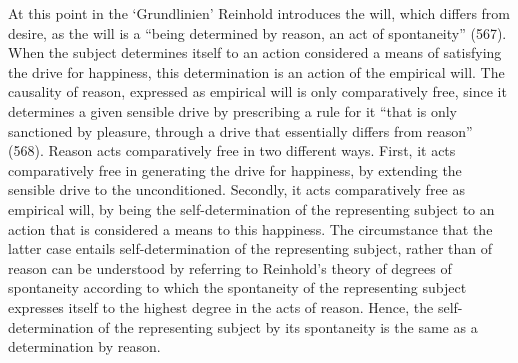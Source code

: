  At this point in the `Grundlinien' Reinhold introduces the will, which differs from desire, as the will is a ``being determined by reason, an act of spontaneity'' (567). When the subject determines itself to an action considered a means of satisfying the drive for happiness, this determination is an action of the empirical will. The causality of reason, expressed as empirical will is only comparatively free, since it determines a given sensible drive by prescribing a rule for it ``that is only sanctioned by pleasure, through a drive that essentially differs from reason'' (568). Reason acts comparatively free in two different ways. First, it acts comparatively free in generating the drive for happiness, by extending the sensible drive to the unconditioned. Secondly, it acts comparatively free as empirical will, by being the self{-}determination of the representing subject to an action that is considered a means to this happiness. The circumstance that the latter case entails self{-}determination of the representing subject, rather than of reason can be understood by referring to Reinhold's theory of degrees of spontaneity according to which the spontaneity of the representing subject expresses itself to the highest degree in the acts of reason. Hence, the self{-}determination of the representing subject by its spontaneity is the same as a determination by reason. 

